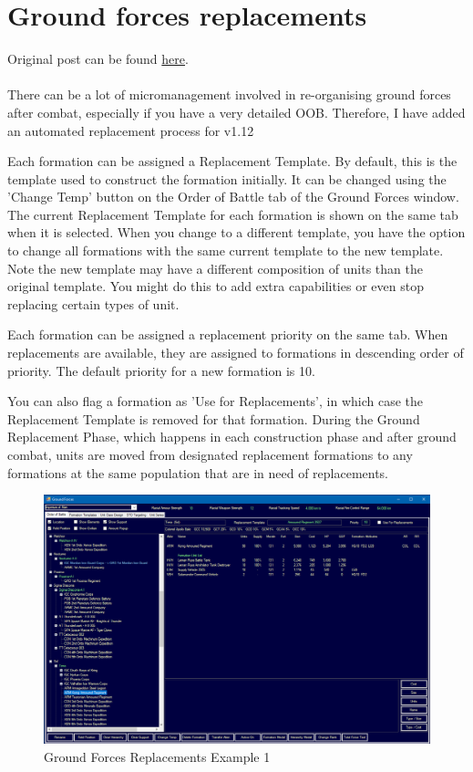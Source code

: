 \documentclass[../../Aurora C# unofficial manual.tex]{subfiles}
\begin{document}
	\section{Ground forces replacements}
	Original post can be found
	\href{http://aurora2.pentarch.org/index.php?topic=11593.msg140370#msg140370}{here}.
	\\\\
	
	There can be a lot of micromanagement involved in re-organising ground forces after combat, especially if you have a very detailed OOB. Therefore, I have added an automated replacement process for v1.12
	
	Each formation can be assigned a Replacement Template. By default, this is the template used to construct the formation initially. It can be changed using the 'Change Temp' button on the Order of Battle tab of the Ground Forces window. The current Replacement Template for each formation is shown on the same tab when it is selected. When you change to a different template, you have the option to change all formations with the same current template to the new template. Note the new template may have a different composition of units than the original template. You might do this to add extra capabilities or even stop replacing certain types of unit.
	
	Each formation can be assigned a replacement priority on the same tab. When replacements are available, they are assigned to formations in descending order of priority. The default priority for a new formation is 10.
	
	You can also flag a formation as 'Use for Replacements', in which case the Replacement Template is removed for that formation. During the Ground Replacement Phase, which happens in each construction phase and after ground combat, units are moved from designated replacement formations to any formations at the same population that are in need of replacements.
	\begin{figure}[H]
		\centering
		\includegraphics[width=0.95\linewidth]{images/Replacements}
		\caption[Replacements]{Ground Forces Replacements Example 1}
		\label{fig:replacements}
	\end{figure}
	
\end{document}
